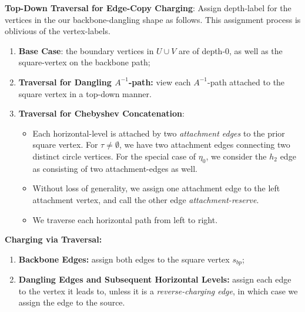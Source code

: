 \documentclass[12pt]{article}
\begin{document}
%
\begin{mdframed} \textbf{Top-Down Traversal for Edge-Copy Charging}:
 Assign depth-label for the vertices in the our backbone-dangling shape as follows. This assignment process is oblivious of the vertex-labels.  \begin{enumerate}  
	\item \textbf{Base Case}: the boundary vertices in $U\cup V$ are of depth-$0$, as well as the square-vertex on the backbone path;
	\item \textbf{Traversal for Dangling $A^{-1}$-path:} view each $A^{-1}$-path attached to the square vertex in a top-down manner.  
	\item   \textbf{Traversal for Chebyshev Concatenation}: \begin{itemize}
	 \item Each horizontal-level is attached by two \emph{attachment edges} to the prior square vertex. For $\tau\neq \emptyset$, we have two attachment edges connecting two distinct circle vertices. For the special case of $\eta_0$, we consider the $h_2$ edge as consisting of two attachment-edges as well.
	 \item Without loss of generality, we assign one attachment edge to the left attachment vertex, and call the other edge \emph{attachment-reserve}.
	 \item We traverse each horizontal path from left to right.
	 	\end{itemize} 
\end{enumerate}
\textbf{Charging via Traversal:} 

\begin{enumerate}
	\item \textbf{Backbone Edges:} assign both edges to the square vertex $s_{bp}$;
	\item \textbf{Dangling Edges and Subsequent Horizontal Levels:} assign each edge to the vertex it leads to, unless it is a \emph{reverse-charging edge}, in which case we assign the edge to the source. \end{enumerate}
\end{mdframed} 
\end{document}
